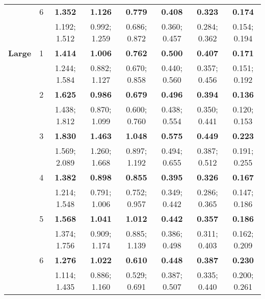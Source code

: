 \begin{table}[!ht]
\begin{center}
\begin{tabular}{>{\bfseries}cccccccc}
 & 6 & \textbf{1.352} & \textbf{1.126} & \textbf{0.779} & \textbf{0.408} & \textbf{0.323} & \textbf{0.174} \\
 &  & 1.192; 1.512 & 0.992; 1.259 & 0.686; 0.872 & 0.360; 0.457 & 0.284; 0.362 & 0.154; 0.194\\[1.2ex]
 \midrule
Large & 1 & \textbf{1.414} & \textbf{1.006} & \textbf{0.762} & \textbf{0.500} & \textbf{0.407} & \textbf{0.171} \\
 &  & 1.244; 1.584 & 0.882; 1.127 & 0.670; 0.858 & 0.440; 0.560 & 0.357; 0.456 & 0.151; 0.192\\[1.2ex]
 & 2 & \textbf{1.625} & \textbf{0.986} & \textbf{0.679} & \textbf{0.496} & \textbf{0.394} & \textbf{0.136} \\
 &  & 1.438; 1.812 & 0.870; 1.099 & 0.600; 0.760 & 0.438; 0.554 & 0.350; 0.441 & 0.120; 0.153\\[1.2ex]
 & 3 & \textbf{1.830} & \textbf{1.463} & \textbf{1.048} & \textbf{0.575} & \textbf{0.449} & \textbf{0.223} \\
 &  & 1.569; 2.089 & 1.260; 1.668 & 0.897; 1.192 & 0.494; 0.655 & 0.387; 0.512 & 0.191; 0.255\\[1.2ex]
 & 4 & \textbf{1.382} & \textbf{0.898} & \textbf{0.855} & \textbf{0.395} & \textbf{0.326} & \textbf{0.167} \\
 &  & 1.214; 1.548 & 0.791; 1.006 & 0.752; 0.957 & 0.349; 0.442 & 0.286; 0.365 & 0.147; 0.186\\[1.2ex]
 & 5 & \textbf{1.568} & \textbf{1.041} & \textbf{1.012} & \textbf{0.442} & \textbf{0.357} & \textbf{0.186} \\
 &  & 1.374; 1.756 & 0.909; 1.174 & 0.885; 1.139 & 0.386; 0.498 & 0.311; 0.403 & 0.162; 0.209\\[1.2ex]
 & 6 & \textbf{1.276} & \textbf{1.022} & \textbf{0.610} & \textbf{0.448} & \textbf{0.387} & \textbf{0.230} \\
 &  & 1.114; 1.435 & 0.886; 1.160 & 0.529; 0.691 & 0.387; 0.507 & 0.335; 0.440 & 0.200; 0.261\\
\bottomrule
\end{tabular}
\end{center}
\end{table}

